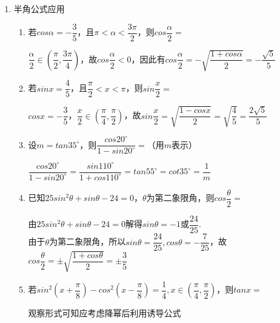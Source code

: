 \begin{enumerate}
\begin{enumerate}
    \end{enumerate}
    \item 半角公式应用
    \begin{enumerate}
        \item 若$cos\alpha = -\dfrac{3}{5}$，且$\pi < \alpha < \dfrac{3\pi}{2}$，则$cos\dfrac{\alpha}{2} = $
        \begin{jieda}
            $\dfrac{\alpha}{2} \in \left (\dfrac{\pi}{2}, \dfrac{3\pi}{4} \right)$，故$cos\dfrac{\alpha}{2}<0$，因此有$cos\dfrac{\alpha}{2} = -\sqrt{\dfrac{1+cos\alpha}{2}} = -\dfrac{\sqrt{5}}{5}$
        \end{jieda}
        \item 若$sinx = \dfrac{4}{5}$，且$\dfrac{\pi}{2} < x < \pi$，则$sin\dfrac{x}{2} = $
        \begin{jieda}
            $cosx = -\dfrac{3}{5}$，$\dfrac{x}{2} \in \left (\dfrac{\pi}{4}, \dfrac{\pi}{2} \right)$，故$sin\dfrac{x}{2} = \sqrt{\dfrac{1-cosx}{2}} = \sqrt{\dfrac{4}{5}} = \dfrac{2\sqrt{5}}{5}$
        \end{jieda}
        \item 设$m = tan35^\circ$，则$\dfrac{cos20^\circ}{1 - sin20^\circ} = $（用$m$表示）
        \begin{jieda}
            $\dfrac{cos20^\circ}{1 - sin20^\circ} = \dfrac{sin110^{\circ}}{1 + cos110^{\circ}} = tan55^{\circ} = cot35^{\circ} = \dfrac{1}{m}$
        \end{jieda}
        \item 已知$25sin^2\theta + sin\theta - 24 = 0$，$\theta$为第二象限角，则$cos\dfrac{\theta}{2} = $
        \begin{jieda}
            由$25sin^2\theta + sin\theta - 24 = 0$解得$sin\theta = -1$或$\dfrac{24}{25}$. \\
            由于$\theta$为第二象限角，所以$sin\theta = \dfrac{24}{25}, cos\theta = -\dfrac{7}{25}$，故$cos\dfrac{\theta}{2} = \pm\sqrt{\dfrac{1+cos\theta}{2}} = \pm\dfrac{3}{5}$
        \end{jieda}
        \item 若$sin^2\left(x+\dfrac{\pi}{8}\right) - cos^2\left(x-\dfrac{\pi}{8}\right) = \dfrac{1}{4}, x \in \left(\dfrac{\pi}{4}, \dfrac{\pi}{2}\right)$，则$tanx = $
        \begin{jieda}
            观察形式可知应考虑降幂后利用诱导公式\\

\end{jieda}
\end{enumerate}
\end{enumerate}

